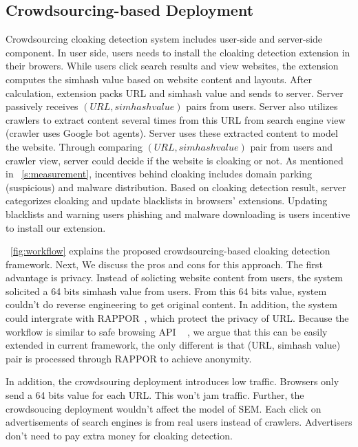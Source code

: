 \subsection{Crowdsourcing-based Deployment}
Crowdsourcing cloaking detection system includes user-side and server-side component. In user side, users needs to install the cloaking
detection extension in their browers. While users click search results and view
websites, the extension computes the simhash value based on 
website content and layouts. After calculation, extension packs URL and simhash
value and sends to server. Server passively receives $(URL, simhash value)$
pairs from users. Server also utilizes crawlers to extract content several times
from this URL from search engine view (crawler uses Google bot agents).
Server uses these extracted content to model the website. Through comparing
$(URL, simhash value)$ pair from users and crawler view,
server could decide if the website is cloaking or not. As mentioned in
~\autoref{s:measurement}, incentives behind cloaking includes domain parking
~\cite{vissers2015parking} (suspicious) and
malware distribution. Based on cloaking
detection result, server categorizes cloaking and update blacklists in browsers' extensions.
Updating blacklists and warning users phishing and
malware downloading is users incentive to install our extension.

~\autoref{fig:workflow} explains the proposed crowdsourcing-based cloaking detection framework. 
Next, We discuss the pros and cons for this approach. The first advantage is privacy. Instead of solicting
website content from users, the system solicited a 64 bits simhash value from users. 
From this 64 bits value, system couldn't do reverse engineering to
get original content. In addition, the system could intergrate with 
RAPPOR~\cite{erlingsson2014rappor}, which protect the privacy of URL.
Because the workflow is similar to safe browsing API ~\cite{rajab2013camp} , we argue that this can be easily
extended in current framework, the only different is that (URL, simhash value)
pair is processed through RAPPOR to achieve anonymity.

In addition, the crowdsouring deployment introduces low traffic. Browsers only send a 64 bits value for
each URL. This won't jam traffic. Further, the crowdsoucing deployment 
wouldn't affect the model of SEM. Each click on advertisements of search engines is
from real users instead of crawlers. Advertisers don't need to pay extra money for cloaking detection. 


%
%


